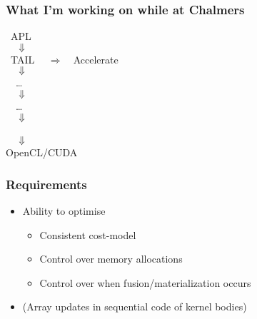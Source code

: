 \documentclass{beamer}
\begin{document}
\begin{frame}
\frametitle{What I'm working on while at Chalmers}

~APL \\
$\quad\Downarrow$ \\
~TAIL $\quad\Rightarrow\quad$Accelerate \\
$\quad\Downarrow$\\
~~\ldots \\
$\quad\Downarrow$ \\
~~\ldots \\
$\quad\Downarrow$ \\
 \\
$\quad\Downarrow$ \\
OpenCL/CUDA
\end{frame}


\begin{frame}
\frametitle{Requirements}
\begin{itemize}

\item Ability to optimise
  \begin{itemize}
  \item Consistent cost-model
  \item Control over memory allocations
  \item Control over when fusion/materialization occurs
  \end{itemize}
\item (Array updates in sequential code of kernel bodies)

\end{itemize}
\end{frame}
\end{document}
